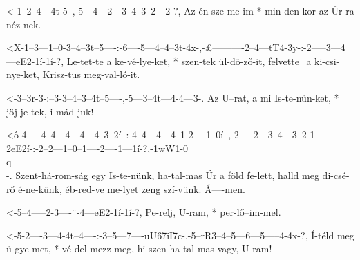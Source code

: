 
  {<-1--2--4---4t-5--,-5---4---2---3--4--3--2---2-?,}
  {  Az én sze-me-im * min-den-kor az Úr-ra néz-nek.}


  {<X-1--3---1--0-3--4--3t--5----:-6----5---4--4--3t-4x-,-£----------2--4---tT4-3y-:-2-----3---4---eE2-1í-1í-?,}
  {   Le-tet-te a ke-vé-lye-ket, * szen-tek ül-dö-ző-it,  felvette_a ki-csi-nye-ket, Krisz-tus meg-val-ló-it.}



  {<-3--3r-3-:--3-3--4--3--4t--5----,-5---3--4t---4-4---3-.}
  {  Az U--rat, a mi Is-te-nün-ket, * jöj-je-tek, i-mád-juk!}


  {<ô-4-----4--4---4---4---4--3--2í--:-4--4---4---4--1-2----1--0í--,-2-----2---3--4---3--2-1--2eE2í-:-2--2---1--0--1----2----1---1í-?,-1wW1-0\\q\\-.}
  {   Szent-há-rom-ság egy Is-te-nünk, ha-tal-mas Úr a föld fe-lett, halld meg di-csé-rő é-ne-künk,   éb-red-ve me-lyet zeng szí-vünk. Á----men.}

  {<-5--4-----2-3----¨-4---eE2-1í-1í-?,}
  {  Pe-relj, U-ram, * per-lő--im-mel.}

  {<-5-2----3---4-4t--4----:-3--5---7----uU67iI7c-,-5--rR3--4--5---6---5-----4-4x-?,}
  {  Í-téld meg ü-gye-met, * vé-del-mezz meg,       hi-szen ha-tal-mas vagy, U-ram!}

